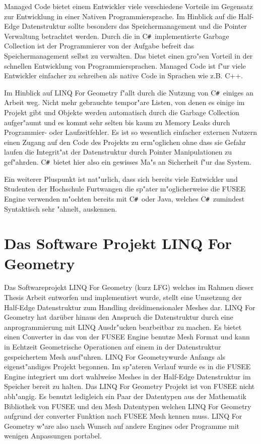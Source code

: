 \documentclass[pagesize, paper=a4, fontsize=12pt,titlepage=true, headings=small, headnosepline, abstractoff, liststotoc, nochapterprefix, plainheadsepline]{scrreprt}
\newcommand{\CSS}{C\texttt{\# }}
\newcommand{\LFG}{LINQ For Geometry}
\newcommand{\LFGS}{LINQ For Geometry }
\newcommand{\HES}{Half-Edge Datenstruktur }
\begin{document}
		Managed Code bietet einem Entwickler viele verschiedene Vorteile im Gegensatz zur Entwicklung in einer Nativen Programmiersprache. Im Hinblick auf die \HES sollte besonders das Speichermanagement und die Pointer Verwaltung betrachtet werden. Durch die in \CSS implementierte Garbage Collection ist der Programmierer von der Aufgabe befreit das Speichermanagement selbst zu verwalten. Das bietet einen gro"sen Vorteil in der schnellen Entwicklung von Programmiersprachen. Managed Code ist f"ur viele Entwickler einfacher zu schreiben als native Code in Sprachen wie z.B. C++.

Im Hinblick auf \LFGS f"allt durch die Nutzung von \CSS einiges an Arbeit weg. Nicht mehr gebrauchte tempor"are Listen, von denen es einige im Projekt gibt und Objekte werden automatisch durch die Garbage Collection aufger"aumt und es kommt sehr selten bis kaum zu Memory Leaks durch Programmier- oder Laufzeitfehler. Es ist so wesentlich einfacher externen Nutzern einen Zugang auf den Code des Projekts zu erm"oglichen ohne dass sie Gefahr laufen die Integrit"at der Datenstruktur durch Pointer Manipulationen zu gef"ahrden. \CSS bietet hier also ein gewisses Ma"s an Sicherheit f"ur das System.

Ein weiterer Pluspunkt ist nat"urlich, dass sich bereits viele Entwickler und Studenten der Hochschule Furtwangen die sp"ater m"oglicherweise die FUSEE Engine verwenden m"ochten bereits mit \CSS oder Java, welches \CSS zumindest Syntaktisch sehr "ahnelt, auskennen.
\section {Das Software Projekt LINQ For Geometry}
Das Softwareprojekt \LFGS (kurz LFG) welches im Rahmen dieser Thesis Arbeit entworfen und implementiert wurde, stellt eine Umsetzung der \HES zum Handling dreidimensionaler Meshes dar. \LFGS hat darüber hinaus den Anspruch die Datenstruktur durch eine anprogrammierung mit LINQ Ausdr"ucken bearbeitbar zu machen. Es bietet einen Converter in das von der FUSEE Engine benutze Mesh Format und kann in Echtzeit Geometrische Operationen auf einem in der Datenstruktur gespeichertem Mesh ausf"uhren. \LFG wurde Anfangs als eigenst"andiges Projekt begonnen. Im sp"ateren Verlauf wurde es in die FUSEE Engine integriert um dort wahlweise Meshes in der \HES im Speicher bereit zu halten. Das \LFGS Projekt ist von FUSEE nicht abh"angig. Es benutzt ledigleich ein Paar der Datentypen aus der Mathematik Bibliothek von FUSEE und den Mesh Datentypen welchen \LFGS aufgrund der converter Funktion nach FUSEE Mesh kennen muss. \LFGS w"are also nach Wunsch auf andere Engines oder Programme mit wenigen Anpassungen portabel.
\end{document}
